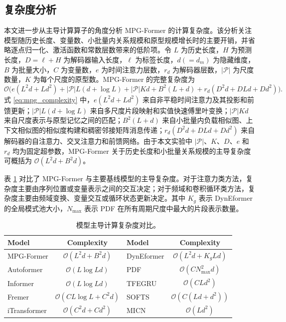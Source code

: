 \documentclass[UTF8]{ctexart}
\begin{document}
\subsection{复杂度分析}

本文进一步从主导计算算子的角度分析 MPG-Former 的计算复杂度。该分析关注模型随历史长度、变量数、小批量内关系规模和原型规模增长时的主要开销，并省略逐点归一化、激活函数和常数层数带来的低阶项。令 $L$ 为历史长度，$H$ 为预测长度，$D=\ell+H$ 为解码器输入长度，$\ell$ 为标签长度，$d(=d_m)$ 为隐藏维度，$B$ 为批量大小，$C$ 为变量数，$e$ 为时间注意力层数，$r_d$ 为解码器层数，$|\mathcal P|$ 为尺度数量，$K$ 为每个尺度的原型数。MPG-Former 的完整复杂度为
\begin{equation}
\mathcal{O}\big(e(L^2d+Ld^2)+|\mathcal{P}|L(d+\log L)+|\mathcal{P}|Kd+B^2(L+d)+r_d(D^2d+DLd+Dd^2)\big).
\label{eq:mpg_complexity}
\end{equation}
式 \eqref{eq:mpg_complexity} 中，$e(L^2d+Ld^2)$ 来自非平稳时间注意力及其投影和前馈更新；$|\mathcal{P}|L(d+\log L)$ 来自多尺度片段映射和实值快速傅里叶变换；$|\mathcal{P}|Kd$ 来自尺度表示与原型记忆之间的匹配；$B^2(L+d)$ 来自小批量内负载相似图、上下文相似图的相似度构建和稠密邻接矩阵消息传递；$r_d(D^2d+DLd+Dd^2)$ 来自解码器的自注意力、交叉注意力和前馈网络。由于本文实验中 $|\mathcal P|$、$K$、$D$、$e$ 和 $r_d$ 均为固定超参数，MPG-Former 关于历史长度和小批量关系规模的主导复杂度可概括为 $\mathcal O(L^2d+B^2d)$。

表 \ref{tab:model_complexity} 对比了 MPG-Former 与主要基线模型的主导复杂度。对于注意力类方法，复杂度主要由序列位置或变量表示之间的交互决定；对于频域和卷积循环类方法，复杂度主要由频域变换、变量交互或循环状态更新决定。其中 $K_g$ 表示 DynEformer 的全局模式池大小，$N_{\max}$ 表示 PDF 在所有周期尺度中最大的片段表示数量。

\begin{table}[H]
\centering
\caption{模型主导计算复杂度对比。}
\label{tab:model_complexity}
\small
\begin{tabular}{lc|lc}
\toprule
Model & Complexity & Model & Complexity \\
\midrule
MPG-Former & $\mathcal{O}(L^2d+B^2d)$ & DynEformer & $\mathcal{O}(L^2d+K_gLd)$ \\
Autoformer & $\mathcal{O}(L\log Ld)$ & PDF & $\mathcal{O}(CN_{\max}^{2}d)$ \\
Informer & $\mathcal{O}(L\log Ld)$ & TFEGRU & $\mathcal{O}(CLd^2)$ \\
Fremer & $\mathcal{O}(CL\log L+C^2d)$ & SOFTS & $\mathcal{O}(C(Ld+d^2))$ \\
iTransformer & $\mathcal{O}(C^2d+Cd^2)$ & MICN & $\mathcal{O}(Ld^2)$ \\
\bottomrule
\end{tabular}
\end{table}
\end{document}
